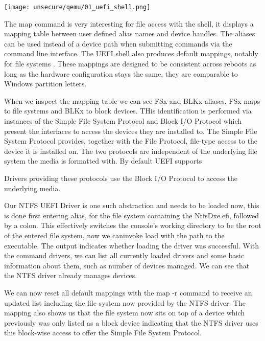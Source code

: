 \texttt{[image: unsecure/qemu/01\_uefi\_shell.png]}


The map command is very interesting for file access with the shell, it displays a mapping table between user defined alias names and device handles. The aliases can be used instead of a device path when submitting commands via the command line interface. The UEFI shell also produces default mappings, notably for file systems \cite[3.7.2. Mappings]{uefi-shell}. These mappings are designed to be consistent across reboots as long as the hardware configuration stays the same, they are comparable to Windows partition letters. \cite[Appendix A]{uefi-shell}

When we inspect the mapping table we can see FSx and BLKx aliases, FSx maps to file systems and BLKx to block devices. THis identification is performed via instances of the Simple File System Protocol and  Block I/O Protocol which present the interfaces to access the devices they are installed to.
The Simple File System Protocol \cite[13.4 Simple File System Protocol]{uefi-spec} provides, together with the File Protocol, file-type access to the device it is installed on. The two protocols are independent of the underlying file system the media is formatted with.
By default UEFI supports

Drivers providing these protocols use the Block I/O Protocol to access the underlying media.


Our NTFS UEFI Driver is one such abstraction and needs to be loaded now, this is done first entering alias, for the file system containing the NtfsDxe.efi, followed by a colon.
This effectively switches the console's working directory to be the root of the entered file system, now we caninvoke load with the path to the executable. The output indicates whether loading the driver was successful.
With the command drivers, we can list all currently loaded drivers and some basic information about them, such as number of devices managed. We can see that the NTFS driver already manages devices.

We can now reset all default mappings with the map -r command to receive an updated list including the file system now provided by the NTFS driver. The mapping also shows us that the file system now sits on top of a device which previously was only listed as a block device indicating that the NTFS driver uses this block-wise access to offer the Simple File System Protocol.

